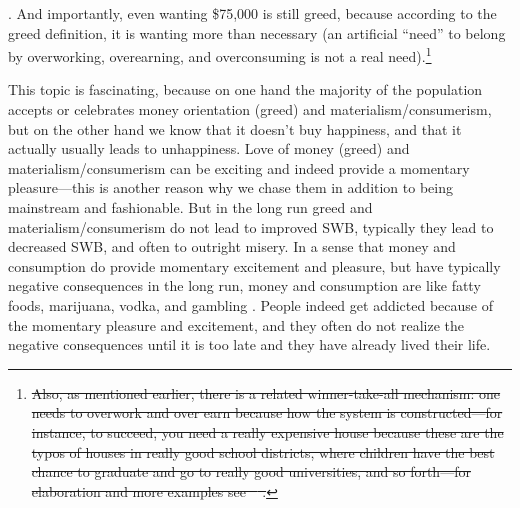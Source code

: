 \documentclass[10pt, letterpaper]{article}
\providecommand{\DIFdeltex}[1]{{\protect\color{red}\sout{#1}}}                      %
\providecommand{\DIFdelend}{} %
\providecommand{\DIFdel}[1]{\texorpdfstring{\DIFdeltex{#1}}{}} %
\DeclareRobustCommand{\DIFdelend}{\DIFOaddend \let\includegraphics\DIFOincludegraphics} %
\begin{document}
\begin{spacing}{1.8}
{. And importantly, even wanting \$75,000 is still greed,
because according to the greed definition, it is wanting more than necessary (an
artificial ``need'' to belong by overworking, overearning, and overconsuming is not a real need).}\footnote{\DIFdel{Also, as mentioned earlier, there is a related winner-take-all
  mechanism: one needs to overwork and over earn because how the system is constructed---for instance, to succeed, you need a really expensive house
  because these are the typos of houses in really good school districts, where children have the best chance to graduate and go to really good universities, and
  so forth---for elaboration and more examples see \mbox{%
\citet{frank12}}\hspace{0pt}%
.}}
\addtocounter{footnote}{-1}%
\DIFdelend %

This topic is fascinating, because on one hand the majority of the population
accepts or celebrates money orientation (greed) and materialism/consumerism, but on the other hand
we know that it doesn't buy happiness, and that it actually usually leads to
unhappiness. Love of money (greed) and materialism/consumerism can be
exciting and indeed provide a momentary pleasure---this is another reason why we
chase them in addition to being mainstream and fashionable. 
But in the long run greed and materialism/consumerism do not lead to improved SWB, typically they lead to decreased SWB, and often to outright misery. In a
sense that money and consumption do provide momentary excitement and pleasure,
but have typically negative consequences in the long run, money and consumption
are like fatty foods, marijuana, vodka, and gambling \citep{linden11}. People
indeed get addicted because of the momentary pleasure and excitement, and they
often do not realize the negative consequences until it is too late and they
have already lived their life. 
%
%
%


\end{spacing}
\end{document}
